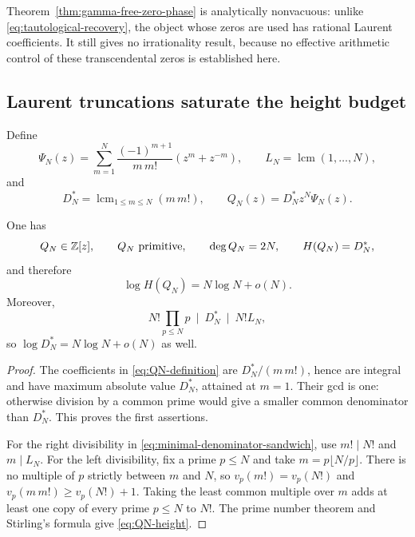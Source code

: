 Theorem~\ref{thm:gamma-free-zero-phase} is analytically nonvacuous: unlike
\eqref{eq:tautological-recovery}, the object whose zeros are used has
rational Laurent coefficients.  It still gives no irrationality result,
because no effective arithmetic control of these transcendental zeros is
established here.

\subsection{Laurent truncations saturate the height budget}

Define
\begin{equation}\label{eq:Psi-truncation}
 \Psi_N(z)=\sum_{m=1}^N
 \frac{(-1)^{m+1}}{m\,m!}(z^m+z^{-m}),
 \qquad
 L_N=\operatorname{lcm}(1,\ldots,N),
\end{equation}
and
\begin{equation}\label{eq:QN-definition}
 D_N^*=\operatorname{lcm}_{1\le m\le N}(m\,m!),
 \qquad
 Q_N(z)=D_N^*z^N\Psi_N(z).
\end{equation}

\begin{lemma}
\label{lem:truncation-denominator-scale}
One has
\[
 Q_N\in\mathbb Z[z],\qquad Q_N\ \text{primitive},\qquad \deg Q_N=2N,
 \qquad H(Q_N)=D_N^*,
\]
and therefore
\begin{equation}\label{eq:QN-height}
 \log H(Q_N)=N\log N+o(N).
\end{equation}
Moreover,
\begin{equation}\label{eq:minimal-denominator-sandwich}
 N!\prod_{p\le N}p\ \mid\ D_N^*\ \mid\ N!L_N,
\end{equation}
so $\log D_N^*=N\log N+o(N)$ as well.
\end{lemma}

\begin{proof}
The coefficients in \eqref{eq:QN-definition} are
$D_N^*/(m\,m!)$, hence are integral and have maximum absolute value
$D_N^*$, attained at $m=1$.  Their gcd is one: otherwise division by a
common prime would give a smaller common denominator than $D_N^*$.
This proves the first assertions.

For the right divisibility in \eqref{eq:minimal-denominator-sandwich}, use
$m!\mid N!$ and $m\mid L_N$.  For the left divisibility, fix a prime
$p\le N$ and take $m=p\lfloor N/p\rfloor$.  There is no multiple of $p$
strictly between $m$ and $N$, so
$v_p(m!)=v_p(N!)$ and
$v_p(m\,m!)\ge v_p(N!)+1$.  Taking the least common multiple over $m$
adds at least one copy of every prime $p\le N$ to $N!$.  The prime number
theorem and Stirling's formula give \eqref{eq:QN-height}.
\end{proof}

